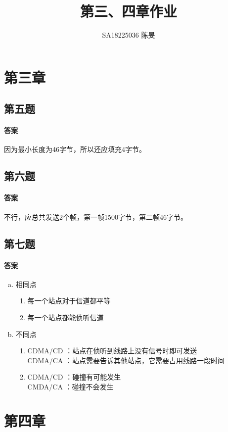 \documentclass[UTF8]{article}
\title{第三、四章作业}
\author{SA18225036 陈旻}
\begin{document}
\date{}
\maketitle
\section{第三章}
\subsection{第五题}
\paragraph{答案}
因为最小长度为46字节，所以还应填充4字节。
\subsection{第六题}
\paragraph{答案}
不行，应总共发送2个帧，第一帧1500字节，第二帧46字节。
\subsection{第七题}
\paragraph{答案}
\begin{enumerate}[a.]
    \item 相同点 
    \begin{enumerate}[1]
        \item 每一个站点对于信道都平等
        \item 每一个站点都能侦听信道
    \end{enumerate}
    \item 不同点
    \begin{enumerate}[1]
        \item CDMA/CD ：站点在侦听到线路上没有信号时即可发送 \\
              CDMA/CA ：站点需要告诉其他站点，它需要占用线路一段时间
        \item CDMA/CD ：碰撞有可能发生 \\
              CMDA/CA ：碰撞不会发生
    \end{enumerate}
\end{enumerate}
\section{第四章}
\end{document}
